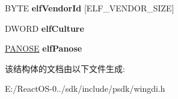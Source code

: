 \begin{DoxyCompactItemize}
B\+Y\+TE {\bfseries elf\+Vendor\+Id} \mbox{[}E\+L\+F\+\_\+\+V\+E\+N\+D\+O\+R\+\_\+\+S\+I\+ZE\mbox{]}
\item 
\mbox{\label{structtag_e_x_t_l_o_g_f_o_n_t_w_aa28bdc5397e16df1947845276af9b1e2}} 
D\+W\+O\+RD {\bfseries elf\+Culture}
\item 
\mbox{\label{structtag_e_x_t_l_o_g_f_o_n_t_w_a76968a52a41887d2a3ae8295e1227284}} 
\hyperlink{structtag_p_a_n_o_s_e}{P\+A\+N\+O\+SE} {\bfseries elf\+Panose}
\end{DoxyCompactItemize}


该结构体的文档由以下文件生成\+:\begin{DoxyCompactItemize}
\item 
E\+:/\+React\+O\+S-\/0../sdk/include/psdk/wingdi.\+h\end{DoxyCompactItemize}
